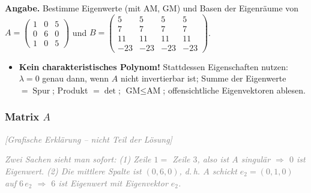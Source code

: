 \documentclass[a4paper,12pt]{article}
\newcommand{\grafik}{\textcolor{gray}{\small\textit{[Grafische Erkl\"arung -- nicht Teil der L\"osung]}}}
\newcommand{\EW}{Eigenwert}
\newcommand{\EV}{Eigenvektor}
\begin{document}
\textbf{Angabe.} Bestimme \EW{}e (mit AM, GM) und Basen der Eigenr\"aume von
$A = \begin{pmatrix} 1 & 0 & 5 \\ 0 & 6 & 0 \\ 1 & 0 & 5 \end{pmatrix}$ und
$B = \begin{pmatrix} 5 & 5 & 5 & 5 \\ 7 & 7 & 7 & 7 \\ 11 & 11 & 11 & 11 \\ -23 & -23 & -23 & -23 \end{pmatrix}$.

\begin{wastun}
\begin{itemize}[leftmargin=*, nosep]
    \item \textbf{Kein charakteristisches Polynom!} Stattdessen Eigenschaften nutzen: $\lambda = 0$ genau dann, wenn $A$ nicht invertierbar ist; Summe der \EW{}e $= \operatorname{Spur}$; Produkt $= \det$; $\text{GM} \le \text{AM}$; offensichtliche \EV{}en ablesen.
\end{itemize}
\end{wastun}

\subsubsection*{Matrix $A$}

\grafik

\begin{center}
\end{center}

\textcolor{gray}{\small\textit{Zwei Sachen sieht man sofort: (1) Zeile $1 =$ Zeile $3$, also ist $A$ singul\"ar $\Rightarrow$ $0$ ist \EW{}. (2) Die mittlere Spalte ist $(0,6,0)$, d.\,h. $A$ schickt $e_2 = (0,1,0)$ auf $6\,e_2$ $\Rightarrow$ $6$ ist \EW{} mit \EV{} $e_2$.}}
\end{document}
